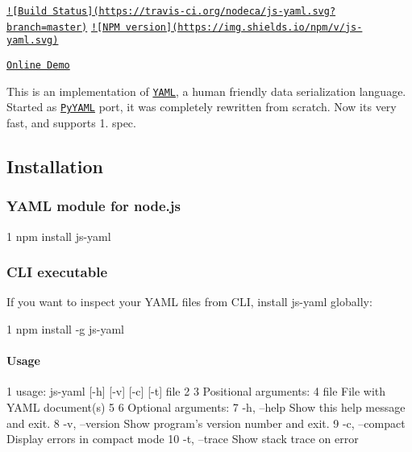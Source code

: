 \href{https://travis-ci.org/nodeca/js-yaml}{\tt !\mbox{[}Build Status\mbox{]}(https\+://travis-\/ci.\+org/nodeca/js-\/yaml.\+svg?branch=master)} \href{https://www.npmjs.org/package/js-yaml}{\tt !\mbox{[}N\+P\+M version\mbox{]}(https\+://img.\+shields.\+io/npm/v/js-\/yaml.\+svg)}

\href{http://nodeca.github.com/js-yaml/}{\tt Online Demo}

This is an implementation of \href{http://yaml.org/}{\tt Y\+A\+M\+L}, a human friendly data serialization language. Started as \href{http://pyyaml.org/}{\tt Py\+Y\+A\+M\+L} port, it was completely rewritten from scratch. Now it\textquotesingle{}s very fast, and supports 1. spec.

\subsection*{Installation }

\subsubsection*{Y\+A\+M\+L module for node.\+js}


\begin{DoxyCode}
1 npm install js-yaml
\end{DoxyCode}


\subsubsection*{C\+L\+I executable}

If you want to inspect your Y\+A\+M\+L files from C\+L\+I, install js-\/yaml globally\+:


\begin{DoxyCode}
1 npm install -g js-yaml
\end{DoxyCode}


\paragraph*{Usage}


\begin{DoxyCode}
1 usage: js-yaml [-h] [-v] [-c] [-t] file
2 
3 Positional arguments:
4   file           File with YAML document(s)
5 
6 Optional arguments:
7   -h, --help     Show this help message and exit.
8   -v, --version  Show program's version number and exit.
9   -c, --compact  Display errors in compact mode
10   -t, --trace    Show stack trace on error
\end{DoxyCode}



